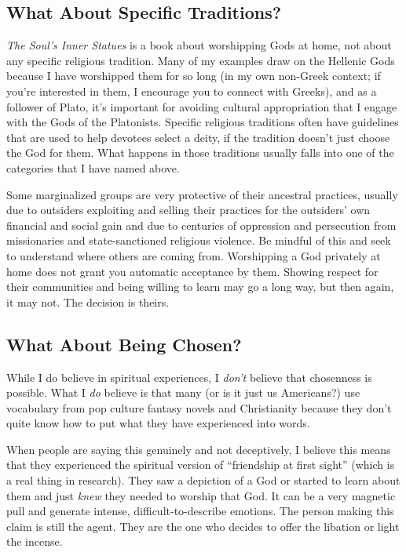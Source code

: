 \documentclass[
]{book}
\begin{document}
\hypertarget{what-about-specific-traditions}{%
\subsection{What About Specific Traditions?}\label{what-about-specific-traditions}}

\emph{The Soul's Inner Statues} is a book about worshipping Gods at home, not about any specific religious tradition. Many of my examples draw on the Hellenic Gods because I have worshipped them for so long (in my own non-Greek context; if you're interested in them, I encourage you to connect with Greeks), and as a follower of Plato, it's important for avoiding cultural appropriation that I engage with the Gods of the Platonists. Specific religious traditions often have guidelines that are used to help devotees select a deity, if the tradition doesn't just choose the God for them. What happens in those traditions usually falls into one of the categories that I have named above.

Some marginalized groups are very protective of their ancestral practices, usually due to outsiders exploiting and selling their practices for the outsiders' own financial and social gain and due to centuries of oppression and persecution from missionaries and state-sanctioned religious violence. Be mindful of this and seek to understand where others are coming from. Worshipping a God privately at home does not grant you automatic acceptance by them. Showing respect for their communities and being willing to learn may go a long way, but then again, it may not. The decision is theirs.

\hypertarget{what-about-being-chosen}{%
\subsection{What About Being Chosen?}\label{what-about-being-chosen}}

While I do believe in spiritual experiences, I \emph{don't} believe that chosenness is possible. What I \emph{do} believe is that many (or is it just us Americans?) use vocabulary from pop culture fantasy novels and Christianity because they don't quite know how to put what they have experienced into words.

When people are saying this genuinely and not deceptively, I believe this means that they experienced the spiritual version of ``friendship at first sight'' (which is a real thing in research). They saw a depiction of a God or started to learn about them and just \emph{knew} they needed to worship that God. It can be a very magnetic pull and generate intense, difficult-to-describe emotions. The person making this claim is still the agent. They are the one who decides to offer the libation or light the incense.
\end{document}
